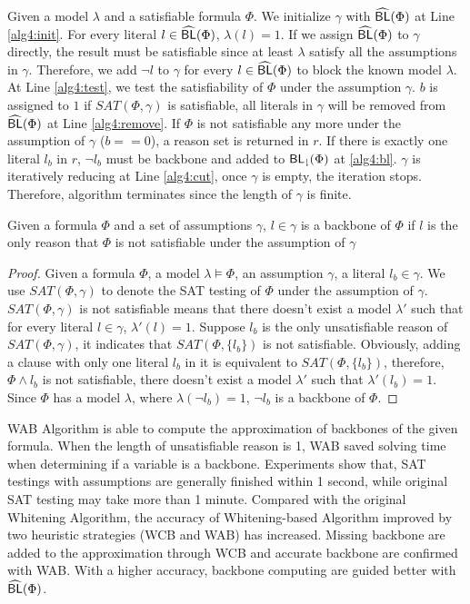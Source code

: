Given a model $\lambda$ and a satisfiable formula $\Phi$. We initialize $\gamma$ with ${\sf \widehat{BL}}(\Phi)$ at Line \ref{alg4:init}. For every literal $l\in{\sf \widehat{BL}}(\Phi)$, $\lambda(l)=1$. If we assign ${\sf \widehat{BL}}(\Phi)$ to $\gamma$ directly, the result must be satisfiable since at least $\lambda$ satisfy all the assumptions in $\gamma$. Therefore, we add $\neg l$ to $\gamma$ for every $l\in{\sf \widehat{BL}}(\Phi)$ to block the known model $\lambda$. At Line \ref{alg4:test}, we test the satisfiability of $\Phi$ under the assumption $\gamma$. $b$ is assigned to $1$ if $SAT(\Phi,\gamma)$ is satisfiable, all literals in $\gamma$ will be removed from ${\sf \widehat{BL}}(\Phi)$ at Line \ref{alg4:remove}. If $\Phi$ is not satisfiable any more under the assumption of $\gamma$ ($b==0$), a reason set is returned in $r$. If there is exactly one literal $l_b$ in $r$, $\neg l_b$ must be backbone and added to ${\sf {BL}_\downharpoonright}(\Phi)$ at \ref{alg4:bl}. $\gamma$ is iteratively reducing at Line \ref{alg4:cut}, once $\gamma$ is empty, the iteration stops. Therefore, algorithm terminates since the length of $\gamma$ is finite.

\begin{theorem}
Given a formula $\Phi$ and a set of assumptions $\gamma$, $l\in\gamma$ is a backbone of $\Phi$ if $l$ is the only reason that $\Phi$ is not satisfiable under the assumption of $\gamma$
\end{theorem}

\begin{proof}
Given a formula $\Phi$, a model $\lambda\models\Phi$, an assumption $\gamma$, a literal $l_b\in\gamma$. We use $SAT(\Phi,\gamma)$ to denote the SAT testing of $\Phi$ under the assumption of $\gamma$. $SAT(\Phi,\gamma)$ is not satisfiable means that there doesn't exist a model $\lambda'$ such that for every literal $l\in\gamma$, $\lambda'(l)=1$. Suppose $l_b$ is the only unsatisfiable reason of $SAT(\Phi,\gamma)$, it indicates that $SAT(\Phi, \{l_b\})$ is not satisfiable. Obviously, adding a clause with only one literal $l_b$ in it is equivalent to $SAT(\Phi,\{l_b\})$, therefore, $\Phi\wedge l_b$ is not satisfiable, there doesn't exist a model $\lambda'$ such that $\lambda'(l_b)=1$. Since $\Phi$ has a model $\lambda$, where $\lambda(\neg l_b)=1$, $\neg l_b$ is a backbone of $\Phi$.
\end{proof}

WAB Algorithm is able to compute the approximation of backbones of the given formula. When the length of unsatisfiable reason is 1, WAB saved solving time when determining if a variable is a backbone. Experiments show that, SAT testings with assumptions are generally finished within 1 second, while original SAT testing may take more than 1 minute. Compared with the original Whitening Algorithm, the accuracy of Whitening-based Algorithm improved by two heuristic strategies (WCB and WAB) has increased. Missing backbone are added to the approximation through WCB and accurate backbone are confirmed with WAB. With a higher accuracy, backbone computing are guided better with ${\sf \widehat{BL}}(\Phi)$.
